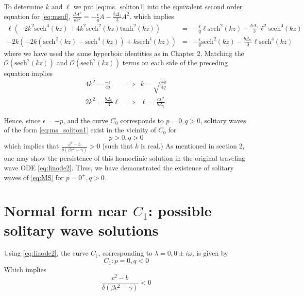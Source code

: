 To determine $k$ and $\ell$ we put \eqref{eq:ms_soliton1} into the equivalent second order equation for \eqref{eq:msnf},
$ \frac{dA^2}{dz^2} = -\frac{\epsilon}{q} A - \frac{b \Delta_1}{3} A^2 $. which implies
\begin{subequations}
\begin{eqnarray*}
\ell \left( - 2 k^2 \mathrm{sech}^4(kz) + 4 k^2 \mathrm{sech}^2(kz) \mathrm{tanh}^2(kz) \right) &=& -\frac{\epsilon}{q} \ell \mathrm{sech}^2(kz) - \frac{b \Delta_1}{3} \ell^2 \mathrm{sech}^4(kz) \\
-2 k\left( -2k \left(\mathrm{sech}^2(kz)-\mathrm{sech}^4(kz)\right) +  k \mathrm{sech}^4(kz)\right) &=& -\frac{\epsilon}{q} \mathrm{sech^2}(kz) - \frac{b \Delta_1}{3} \ell \mathrm{sech}^4(kz)
 \end{eqnarray*}
\end{subequations}
where we have used the same hyperboic identities as in Chapter 2.  
Matching the $\mathcal{O}(\mathrm{sech}^2(kz))$ and $\mathcal{O}(\mathrm{sech}^2(kz))$ terms on each side of the preceding equation implies
\begin{subequations}
\begin{eqnarray}
4k^2 = \frac{-\epsilon}{4q} &\implies& k = \sqrt{\frac{-\epsilon}{4q}}  \\
2 k^2 =  \frac{b \Delta_1}{3} \ell &\implies& \ell = \frac{6 k^2}{ b \Delta_1 }
 \end{eqnarray}
\end{subequations}

Hence, since $\epsilon = - p $, and the curve $C_0$ corresponds to $p=0,q>0$, solitary waves of the 
form \eqref{eq:ms_soliton1} exist in the vicinity of $C_0$ for 
\begin{equation}
p > 0, q > 0 
\end{equation}
which implies that $  \frac{c^2 - b}{\delta\left(\beta c^2 - \gamma\right)} > 0 $
(such that $k$  is real.)  As mentioned in section 2, one may show the persistence
of this homoclinic solution in the original traveling wave ODE \eqref{eq:linode2}. Thus, we have 
demonstrated the existence of solitary waves of \eqref{eq:MS} for $p=0^+, q>0$. 

\section{Normal form near $C_1$: possible solitary wave solutions}
Using \eqref{eq:linode2}, the curve $C_1$, corresponding to $\lambda = 0, 0\pm i \omega$, is given by
\begin{equation}\label{eq:ms_c1}
C_1 : { p = 0, q < 0 }
\end{equation}
Which implies
\begin{equation}
\frac{c^2 - b}{ \delta\left(\beta c^2 - \gamma \right)} < 0
\end{equation}

